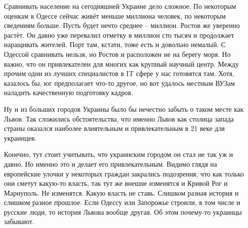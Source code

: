 Сравнивать население на сегодняшней Украине дело сложное. По некоторым оценкам
в Одессе сейчас живёт меньше миллиона человек, по некоторым сведениям больше.
Пусть будет нечто среднее – миллион. Ростов же уверенно растёт. Он давно уже
перевалил отметку в миллион сто тысяч и продолжает наращивать жителей. Порт
там, кстати, тоже есть и довольно немалый. С Одессой сравнивать нельзя, но
Ростов и расположен не на берегу моря. Но важно, что он привлекателен для
многих как крупный научный центр. Между прочим одни из лучших специалистов в IT
сфере у нас готовятся там. Хотя, казалось бы, юг предполагает что-то другое, но
вот удалось местным ВУЗам наладить качественную подготовку кадров.

Ну и из больших городов Украины было бы нечестно забыть о таком месте как
Львов. Так сложились обстоятельства, что именно Львов как столица запада страны
оказался наиболее влиятельным и привлекательным в 21 веке для украинцев.

Конечно, тут стоит учитывать, что украинским городом он стал не так уж и давно.
Но именно это и делает его привлекательным. Видимо глядя на европейские улочки
у некоторых граждан закрались подозрения, что как только они сметут какую-то
власть, так тут же внешне изменятся и Кривой Рог и Мариуполь. Не изменятся.
Какую власть не ставь. Слишком разная история и слишком разное прошлое. Если
Одессу или Запорожье строили, в том числе и русские люди, то история Львова
вообще другая. Об этом почему-то украинцы забывают.
